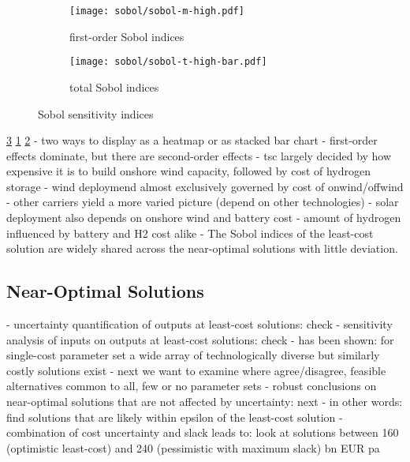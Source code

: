 
\begin{figure}
    \begin{subfigure}[t]{0.45\textwidth}
        \caption{first-order Sobol indices}
        \label{fig:sobol:first}
        \texttt{[image: sobol/sobol-m-high.pdf]}
    \end{subfigure}
    \begin{subfigure}[t]{0.54\textwidth}
        \caption{total Sobol indices}
        \label{fig:sobol:total}
        \texttt{[image: sobol/sobol-t-high-bar.pdf]}
    \end{subfigure}
    \caption{Sobol sensitivity indices}
    \label{fig:sobol}
\end{figure}

\cref{fig:sobol} \cref{fig:sobol:first} \cref{fig:sobol:total}
- two ways to display as a heatmap or as stacked bar chart
- first-order effects dominate, but there are second-order effects
- tsc largely decided by how expensive it is to build onshore wind capacity, followed by cost of hydrogen storage
- wind deploymend almost exclusively governed by cost of onwind/offwind
- other carriers yield a more varied picture (depend on other technologies)
- solar deployment also depends on onshore wind and battery cost
- amount of hydrogen influenced by battery and H2 cost alike
- The Sobol indices of the least-cost solution are widely shared across the near-optimal solutions with little deviation.

\subsection{Near-Optimal Solutions}

- uncertainty quantification of outputs at least-cost solutions: check
- sensitivity analysis of inputs on outputs at least-cost solutions: check
- has been shown: for single-cost parameter set a wide array of technologically diverse but similarly costly solutions exist
- next we want to examine where agree/disagree, feasible alternatives common to all, few or no parameter sets
- robust conclusions on near-optimal solutions that are not affected by uncertainty: next
- in other words: find solutions that are likely within epsilon of the least-cost solution
- combination of cost uncertainty and slack leads to: look at solutions between 160 (optimistic least-cost) and 240 (pessimistic with maximum slack) bn EUR pa


